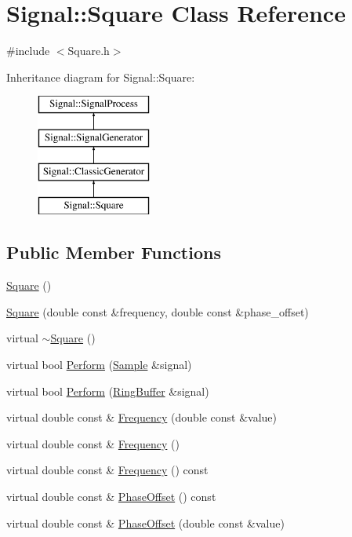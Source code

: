 \hypertarget{classSignal_1_1Square}{\section{Signal\+:\+:Square Class Reference}
\label{classSignal_1_1Square}
}


{\ttfamily \#include $<$Square.\+h$>$}

Inheritance diagram for Signal\+:\+:Square\+:\begin{figure}[H]
\begin{center}
\leavevmode
\includegraphics[height=4.000000cm]{classSignal_1_1Square}
\end{center}
\end{figure}
\subsection*{Public Member Functions}
\begin{DoxyCompactItemize}
\item 
\hyperlink{classSignal_1_1Square_a7f26603d620762e80c72de9750f6a7fc}{Square} ()
\item 
\hyperlink{classSignal_1_1Square_af0ead34823fa035db3aa1bcf39116a46}{Square} (double const \&frequency, double const \&phase\+\_\+offset)
\item 
virtual \hyperlink{classSignal_1_1Square_a2eda1d209b2c919a3ce4ff40f2f9fed4}{$\sim$\+Square} ()
\item 
virtual bool \hyperlink{classSignal_1_1Square_a584e1b867aed4cc4a808d8fb844387bc}{Perform} (\hyperlink{classSignal_1_1Sample}{Sample} \&signal)
\item 
virtual bool \hyperlink{classSignal_1_1Square_ab398eba1087030249d04f27a364f45ed}{Perform} (\hyperlink{classSignal_1_1RingBuffer}{Ring\+Buffer} \&signal)
\item 
virtual double const \& \hyperlink{classSignal_1_1Square_a19f966d5b1800f5487cdd164747b21c0}{Frequency} (double const \&value)
\item 
virtual double const \& \hyperlink{classSignal_1_1Square_a49e8516818f89e05ad19dc09b2531e96}{Frequency} ()
\item 
virtual double const \& \hyperlink{classSignal_1_1SignalGenerator_a96af42ee68f94e9b04d034fd68b73ecd}{Frequency} () const 
\item 
virtual double const \& \hyperlink{classSignal_1_1SignalGenerator_ac2538ec946f001e394d2416fda698d1c}{Phase\+Offset} () const 
\item 
virtual double const \& \hyperlink{classSignal_1_1SignalGenerator_ac6a103ff72beaa338f6d18c812522d78}{Phase\+Offset} (double const \&value)
\end{DoxyCompactItemize}
